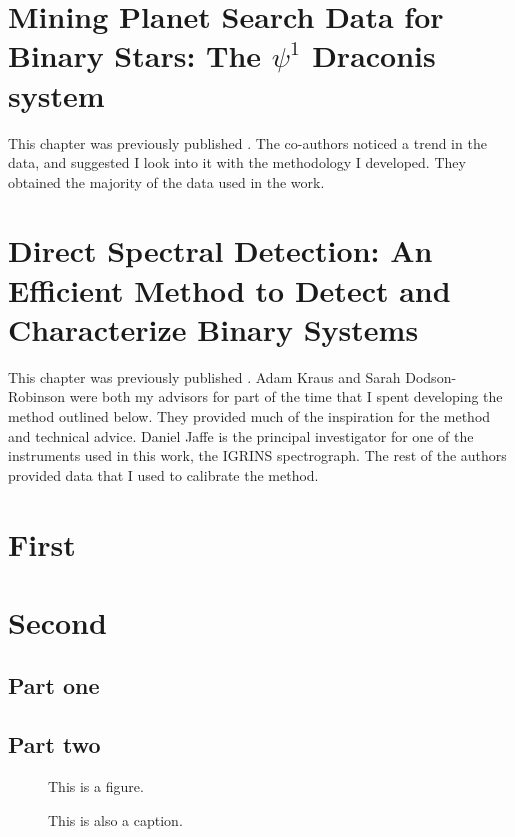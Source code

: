 \documentclass{utthesis}
\begin{document}


\chapter{Mining Planet Search Data for Binary Stars: The $\psi^1$ Draconis system}
This chapter was previously published \citep{Gullikson2015}. The co-authors noticed a trend in the data, and suggested I look into it with the methodology I developed. They obtained the majority of the data used in the work.




\chapter{Direct Spectral Detection: An Efficient Method to Detect and Characterize Binary Systems}
This chapter was previously published \citep{Gullikson2016}. Adam Kraus and Sarah Dodson-Robinson were both my advisors for part of the time that I spent developing the method outlined below. They provided much of the inspiration for the method and technical advice. Daniel Jaffe is the principal investigator for one of the instruments used in this work, the IGRINS spectrograph. The rest of the authors provided data that I used to calibrate the method.




\begin{appendix}

\chapter{First}
\lipsum[3]

\chapter{Second}
\section{Part one}
\lipsum[3]
\section{Part two}
\begin{figure}
This is a figure.
\caption[That]{This is also a caption.}
\end{figure}

\end{appendix}

\backmatter

\printindex

\cleardoublepage
{}

\end{document}
